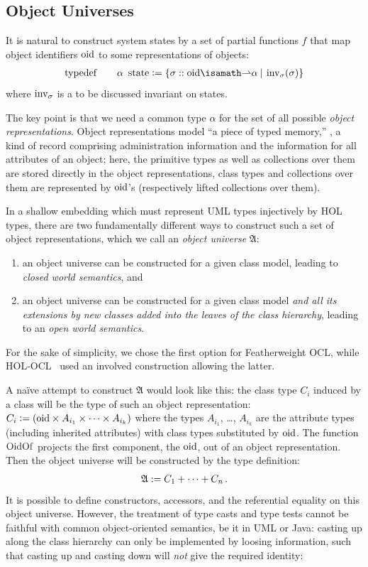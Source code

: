 \subsection{Object Universes}

It is natural to construct system states by a set of partial functions
$f$ that map object identifiers $\mathrm{oid}$ to some representations of
objects:
\begin{gather}
       \typedef \qquad \alpha~\state{} \defeq \{ \sigma ::
        \oid \isasymrightharpoonup \alpha \ap|\ap \inv_\sigma(\sigma) \}
\end{gather}
where $\operatorname{inv}_\sigma$ is a to be discussed invariant on states.

The key point is that we need a common type $\alpha$ for the set of all
possible \emph{object representations}.  Object representations model
``a piece of typed memory,'' \ie, a kind of record comprising
administration information and the information for all attributes of
an object; here, the primitive types as well as collections over them
are stored directly in the object representations, class types and
collections over them are represented by $\mathrm{oid}$'s (respectively lifted
collections over them).

In a shallow embedding which must represent
UML types injectively by HOL types, there are two fundamentally
different ways to construct such a set of object representations,
which we call an \emph{object universe} $\mathfrak{A}$:
\begin{enumerate}
\item an object universe can be constructed for a given class model,
  leading to \emph{closed world semantics}, and
\item an object universe can be constructed for a given class model
  \emph{and all its extensions by new classes added into the leaves of
    the class hierarchy}, leading to an \emph{open world semantics}.
\end{enumerate}
For the sake of simplicity, we chose the first option for
Featherweight OCL, while HOL-OCL~\cite{brucker.ea:extensible:2008-b}
used an involved construction allowing the latter.

A na\"ive attempt to construct $\mathfrak{A}$ would look like this:
the class type $C_i$ induced by a class will be the type of such an
object representation: $C_i \mathrel{\mathop:}= (\mathrm{oid} \times A_{i_1} \times \cdots
\times A_{i_k} )$ where the types $A_{i_1}$, \ldots, $A_{i_k}$ are the
attribute types (including inherited attributes) with class types
substituted by $\mathrm{oid}$. The function $\HolOclOidOf$ projects the first
component, the $\mathrm{oid}$, out of an object representation. Then the
object universe will be constructed by the type definition:
\begin{gather}
\mathfrak{A} := C_1 + \cdots +  C_n\,\text{.}
\end{gather}
It is possible to define constructors, accessors, and the referential
equality on this object universe. However, the treatment of type casts
and type tests cannot be faithful with common object-oriented
semantics, be it in UML or Java: casting up along the class hierarchy
can only be implemented by loosing information, such that casting up
and casting down will \emph{not} give the required identity:

